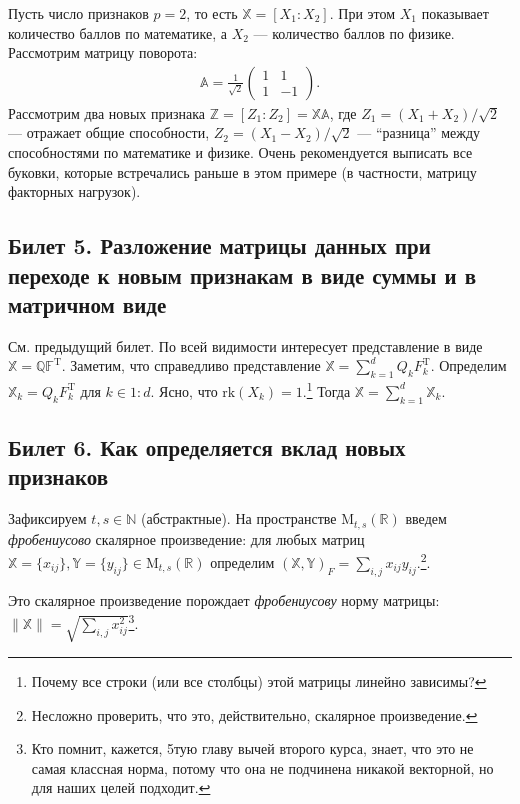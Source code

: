 \begin{ex}
    Пусть число признаков $p = 2$, то есть $\mathbb X = [X_1 \colon X_2]$. При этом $X_1$ показывает количество баллов по математике, а $X_2$ --- количество баллов по физике.
    Рассмотрим матрицу поворота:
    \begin{gather*}
        \mathbb A = \frac{1}{\sqrt{2}}
        \begin{pmatrix}
            1  &  1 \\
            1  & -1
        \end{pmatrix}.
    \end{gather*}
    Рассмотрим два новых признака $\mathbb Z = [Z_1 \colon Z_2] = \mathbb {X A}$, где $Z_1 = (X_1 + X_2) / \sqrt{2}$ --- отражает общие способности, $Z_2 = (X_1 - X_2) / \sqrt{2}$ --- ``разница'' между способностями по математике и физике.
    Очень рекомендуется выписать все буковки, которые встречались раньше в этом примере (в частности, матрицу факторных нагрузок).
\end{ex}


\subsection{Билет 5. Разложение матрицы данных при переходе к новым признакам в виде суммы и в матричном виде}

См. предыдущий билет. По всей видимости интересует представление в виде $\mathbb X = \mathbb Q \mathbb F^\mathrm T$.
Заметим, что справедливо представление $\mathbb X = \sum_{k=1}^d Q_k F_k^\mathrm T$.
Определим $\mathbb X_k = Q_k F_k^\mathrm T$ для $k \in 1:d$. Ясно, что $\mathrm{rk}(X_k) = 1$.\footnote{Почему все строки (или все столбцы) этой матрицы линейно зависимы?}
Тогда $\mathbb X = \sum_{k=1}^d \mathbb X_k$.

\subsection{Билет 6. Как определяется вклад новых признаков}

\begin{dfn}
    Зафиксируем $t, s \in \mathbb N$ (абстрактные). На пространстве $\mathrm M_{t,s} (\mathbb R)$ введем \textit{фробениусово}
    скалярное произведение: для любых матриц $\mathbb X = \{x_{ij}\}, \mathbb Y = \{y_{ij}\} \in \mathrm M_{t, s} (\mathbb R)$ определим $(\mathbb X, \mathbb Y)_F = \sum_{i,j} x_{ij} y_{ij}$.\footnote{
    Несложно проверить, что это, действительно, скалярное произведение.}.

    Это скалярное произведение порождает \textit{фробениусову} норму матрицы: \\$\|\mathbb X\| = \sqrt{\sum_{i,j} x_{ij}^2}$\footnote{Кто помнит, кажется, 5тую главу вычей второго курса,
    знает, что это не самая классная норма, потому что она не подчинена никакой векторной, но для наших целей подходит.}.
\end{dfn}


